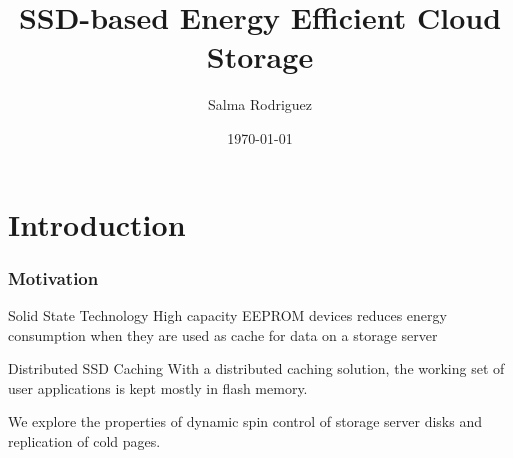 \documentclass{beamer}
\title[Florida International University]{SSD-based Energy Efficient Cloud Storage}
\author{Salma Rodriguez}
\institute[University] {
Florida International University \\
\medskip
{\emph{srodr063@fiu.edu}}}
\date{\today}
\begin{document}
%
\section{Introduction}
%
\begin{frame}
\titlepage
\end{frame}
%
\begin{frame}
\frametitle{Motivation}
\begin{block}
{Solid State Technology}
High capacity EEPROM devices
reduces energy consumption when they are used
as cache for data on a storage server
\end{block}
\begin{block}
{Distributed SSD Caching}
With a distributed caching solution, the working set of user
applications is kept mostly in flash memory.
\end{block}
\begin{block}
We explore the properties of dynamic spin control of storage
server disks and replication of cold pages.
\end{block}
\end{frame}
%
\end{document}
